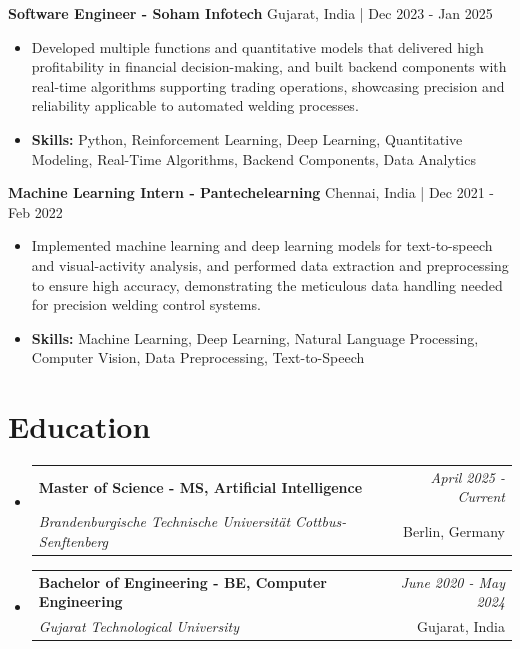 \documentclass[a4paper,11pt]{article}
\makeatletter
\newcommand{\resumeSubheading}[4]{
\vspace{0.5mm}\item
    \begin{tabular*}{\linewidth}[t]{l@{\extracolsep{\fill}}r}
        \textbf{#1} & \textit{\footnotesize{#4}} \\
        \textit{\footnotesize{#3}} &  \footnotesize{#2}\\
    \end{tabular*}
    \vspace{-2.4mm}
}
\makeatother
\begin{document}
\vspace{1mm}
  \textbf{Software Engineer - Soham Infotech} \hfill Gujarat, India | Dec 2023 - Jan 2025
\vspace{-1.5mm} %
\begin{itemize}
  \item Developed multiple functions and quantitative models that delivered high profitability in financial decision-making, and built backend components with real-time algorithms supporting trading operations, showcasing precision and reliability applicable to automated welding processes.

\vspace{-2mm}
  \item \textbf{Skills:} Python, Reinforcement Learning, Deep Learning, Quantitative Modeling, Real-Time Algorithms, Backend Components, Data Analytics
\end{itemize}

\vspace{1mm}
  \textbf{Machine Learning Intern - Pantechelearning} \hfill Chennai, India | Dec 2021 - Feb 2022
\vspace{-1.5mm} %
\begin{itemize}
  \item Implemented machine learning and deep learning models for text-to-speech and visual-activity analysis, and performed data extraction and preprocessing to ensure high accuracy, demonstrating the meticulous data handling needed for precision welding control systems.
\vspace{-2mm}
  \item \textbf{Skills:} Machine Learning, Deep Learning, Natural Language Processing, Computer Vision, Data Preprocessing, Text-to-Speech
\end{itemize}\section{\textbf{Education}}
\vspace{-0.4mm}

\begin{itemize}[leftmargin=0.15in, label={}]
\resumeSubheading
{Master of Science - MS, Artificial Intelligence }{Berlin, Germany}
{Brandenburgische Technische Universität Cottbus-Senftenberg  }{April 2025 - Current}

\vspace{1.0mm} %
\resumeSubheading
{Bachelor of Engineering - BE, Computer Engineering  }{Gujarat, India}
{Gujarat Technological University }{June 2020 - May 2024}

\end{itemize}
\end{document}
